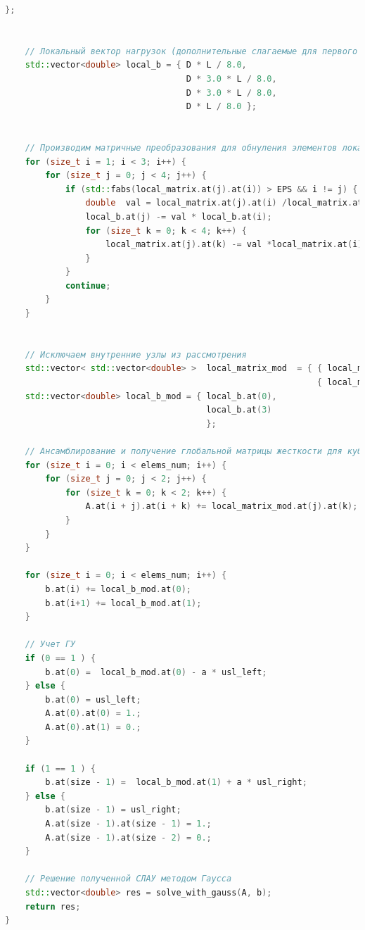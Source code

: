\begin{lstlisting}[language=c++, label=prog,caption={\textit{Реализация МКЭ}}]
    };

    
    // Локальный вектор нагрузок (дополнительные слагаемые для первого и последнего элементов учитываются далее)
    std::vector<double> local_b = { D * L / 8.0,
                                    D * 3.0 * L / 8.0,
                                    D * 3.0 * L / 8.0,
                                    D * L / 8.0 };

    
    // Производим матричные преобразования для обнуления элементов локальной матрицы жесткости, относящихся к внутренним узлам
    for (size_t i = 1; i < 3; i++) {
        for (size_t j = 0; j < 4; j++) {
            if (std::fabs(local_matrix.at(j).at(i)) > EPS && i != j) {
                double  val = local_matrix.at(j).at(i) /local_matrix.at(i).at(i);
                local_b.at(j) -= val * local_b.at(i);
                for (size_t k = 0; k < 4; k++) {
                    local_matrix.at(j).at(k) -= val *local_matrix.at(i).at(k);
                }
            }
            continue;
        }
    }
    
    
    // Исключаем внутренние узлы из рассмотрения
    std::vector< std::vector<double> >  local_matrix_mod  = { { local_matrix.at(0).at(0), local_matrix.at(0).at(3) },
                                                              { local_matrix.at(3).at(0), local_matrix.at(3).at(3) } };
    std::vector<double> local_b_mod = { local_b.at(0), 
                                        local_b.at(3)
                                        };
    
    // Ансамблирование и получение глобальной матрицы жесткости для кубического КЭ
    for (size_t i = 0; i < elems_num; i++) {
        for (size_t j = 0; j < 2; j++) {
            for (size_t k = 0; k < 2; k++) {
                A.at(i + j).at(i + k) += local_matrix_mod.at(j).at(k);
            }
        }
    }

    for (size_t i = 0; i < elems_num; i++) {
        b.at(i) += local_b_mod.at(0);
        b.at(i+1) += local_b_mod.at(1);
    }
       
    // Учет ГУ
    if (0 == 1 ) {
        b.at(0) =  local_b_mod.at(0) - a * usl_left;
    } else {
        b.at(0) = usl_left;
        A.at(0).at(0) = 1.;
        A.at(0).at(1) = 0.;
    }

    if (1 == 1 ) {
        b.at(size - 1) =  local_b_mod.at(1) + a * usl_right;
    } else {
        b.at(size - 1) = usl_right;
        A.at(size - 1).at(size - 1) = 1.;
        A.at(size - 1).at(size - 2) = 0.;
    }
    
    // Решение полученной СЛАУ методом Гаусса
    std::vector<double> res = solve_with_gauss(A, b);
    return res;
}


\end{lstlisting}

